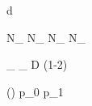 
\newmathsymbol{\tagdecision}     {d}
\newmathsymbol{\mistagestimate}  {\eta}
\newmathsymbol{\mistag}          {\omega}

\newmathsymbol{\Ntagged}         {N_}
\newmathsymbol{\NRtagged}        {N_}
\newmathsymbol{\NWtagged}        {N_}
\newmathsymbol{\NUtagged}        {N_}

\newmathsymbol{\tageff}          {\epsilon_}
\newmathsymbol{\efftageff}       {\epsilon_}
\newmathsymbol{\tagdilution}     {D}
\newmathsymbol{\tagdilutionlg}   {(1-2\mistag)}

\newmathsymbol{\omofeta}         {\mistag(\mistagestimate)}
\newmathsymbol{\pzero}           {p_0}
\newmathsymbol{\pone}            {p_1}
\newmathsymbol{\avgmistagestimate}{\langle\mistagestimate\rangle}